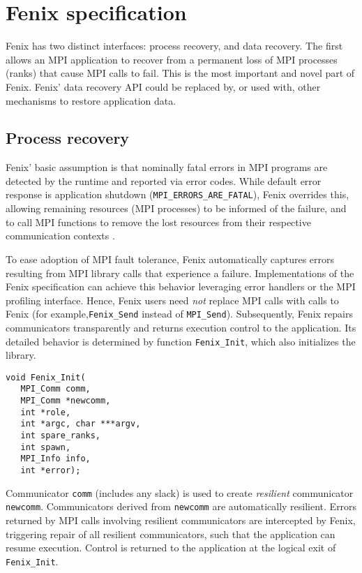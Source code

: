 \section{Fenix specification}\label{sec:spec}
Fenix has two distinct interfaces: process recovery, and data recovery.
The first allows an MPI application to recover from a permanent loss of MPI 
processes (ranks) that cause MPI calls to fail.
This is the most important and novel part of Fenix.
Fenix' data recovery API could be replaced by, or used with, other mechanisms to 
restore application data.
\subsection{Process recovery}
Fenix' basic assumption is that nominally fatal errors in MPI programs
are detected by the runtime and reported via error codes.
While default error response is application shutdown
(\texttt{MPI\_ERRORS\_ARE\_FATAL}), Fenix overrides this, allowing remaining
resources (MPI processes) to be informed of the failure, and to call MPI functions 
to remove the lost resources from their respective communication contexts \cite{Gamell:2014}.

To ease adoption of MPI fault tolerance, Fenix automatically captures 
errors resulting from MPI library calls that experience a failure. 
%
Implementations of the Fenix specification can achieve this behavior
leveraging error handlers or the MPI profiling interface.
%
Hence, Fenix users need \emph{not} replace MPI calls with calls to Fenix  
(for example,\texttt{Fenix\_Send} instead of \texttt{MPI\_Send}).
Subsequently, Fenix repairs communicators transparently and returns  execution 
control to the application. 
Its detailed behavior is determined by function \texttt{Fenix\_Init}, which
also initializes the library.
\begin{verbatim}
void Fenix_Init(
   MPI_Comm comm,
   MPI_Comm *newcomm, 
   int *role, 
   int *argc, char ***argv, 
   int spare_ranks, 
   int spawn,
   MPI_Info info,
   int *error);
\end{verbatim}
Communicator \texttt{comm} (includes any slack)
is used to create \textit{resilient} communicator \texttt{newcomm}. 
Communicators derived from \texttt{newcomm} are automatically resilient.
Errors returned by MPI calls involving resilient communicators are intercepted by Fenix,
triggering repair of all resilient communicators, such that the application can resume execution.
Control is returned to the application at the 
logical exit of \texttt{Fenix\_Init}.

